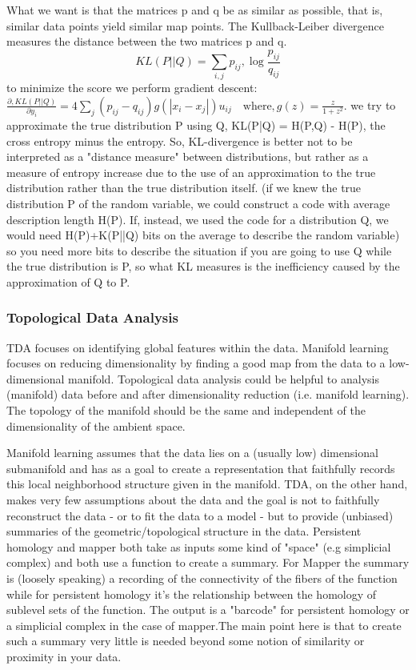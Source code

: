 \documentclass[11pt]{article}
\begin{document}
What we want is that the matrices p and q be as similar as possible, that is, similar data points yield similar map points.
The Kullback-Leiber divergence measures the distance between the two matrices p and q. 
\begin{equation}
KL(P||Q) = \sum_{i, j} p_{ij} , \log \frac{p_{ij}}{q_{ij}}
\end{equation}
to minimize the score we perform gradient descent:
\(\frac{\partial , KL(P || Q)}{\partial y_i} = 4 \sum_j (p_{ij} - q_{ij}) g\left( \left| x_i - x_j\right| \right) u_{ij} \quad \textrm{where} , g(z) = \frac{z}{1+z^2}.\)
we try to approximate the true distribution P using Q, KL(P|Q) = H(P,Q) - H(P), the cross entropy minus the entropy.
So, KL-divergence is better not to be interpreted as a "distance measure" between distributions, but rather as a measure of entropy increase due to the use of an approximation to the true distribution rather than the true distribution itself. (if we knew the true distribution P of the random variable, we could construct a code with average description length H(P). If, instead, we used the code for a distribution Q, we would need H(P)+K(P||Q) bits on the average to describe the random variable) so you need more bits to describe the situation if you are going to use Q while the true distribution is P, so what KL measures is the inefficiency caused by the approximation of Q to P.

\subsubsection{Topological Data Analysis}
TDA focuses on identifying global features within the data.
Manifold learning focuses on reducing dimensionality by finding a good map from the data to a low-dimensional manifold. Topological data analysis could be helpful to analysis (manifold) data before and after dimensionality reduction (i.e. manifold learning). The topology of the manifold should be the same and independent of the dimensionality of the ambient space.

Manifold learning assumes that the data lies on a (usually low) dimensional submanifold and has as a goal to create a representation that faithfully records this local neighborhood structure given in the manifold. 
TDA, on the other hand, makes very few assumptions about the data and the goal is not to faithfully reconstruct the data - or to fit the data to a model - but to provide (unbiased) summaries of the geometric/topological structure in the data.
Persistent homology and mapper both take as inputs some kind of "space" (e.g simplicial complex) and both use a function to create a summary. For Mapper the summary is (loosely speaking) a recording of the connectivity of the fibers of the  function while for persistent homology it's the relationship between the homology of sublevel sets of the function. The output is a "barcode" for persistent homology or a simplicial complex in the case of mapper.The main point here is that to create such a summary very little is needed beyond some notion of similarity or proximity in your data.
\end{document}
